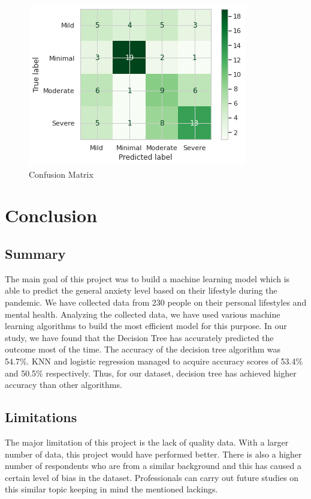 \documentclass[12pt, english]{article}
\begin{document}
\begin{figure}[H]
\includegraphics[scale=0.75]{images/conf_matrix.png}
\centering
\caption{Confusion Matrix}
\end{figure}

\section{Conclusion}
\subsection{Summary}
The main goal of this project was to build a machine learning model which is able to predict the general anxiety level based on their lifestyle during the pandemic. We have collected data from 230 people on their personal lifestyles and mental health. Analyzing the collected data, we have used various machine learning algorithms to build the most efficient model for this purpose. In our study, we have found that the Decision Tree has accurately predicted the outcome most of the time. The accuracy of the decision tree algorithm was 54.7\%. KNN and logistic regression managed to acquire accuracy scores of 53.4\% and 50.5\% respectively. Thus, for our dataset, decision tree has achieved higher accuracy than other algorithms.

\subsection{Limitations}
The major limitation of this project is the lack of quality data. With a larger number of data, this project would have performed better. There is also a higher number of respondents who are from a similar background and this has caused a certain level of bias in the dataset. Professionals can carry out future studies on this similar topic keeping in mind the mentioned lackings.
\end{document}
